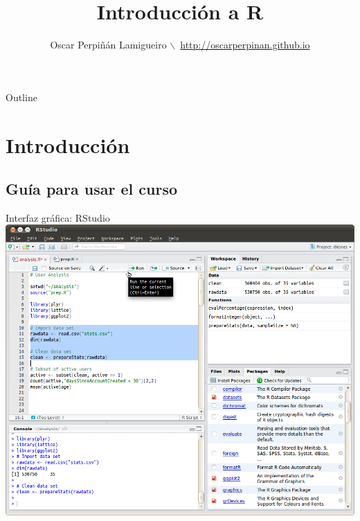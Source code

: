 \documentclass[xcolor={usenames,svgnames,dvipsnames}]{beamer}
\author{Oscar Perpiñán Lamigueiro $\backslash$\ \url{http://oscarperpinan.github.io}}
\date{}
\title{Introducción a R}
\begin{document}
\maketitle
\begin{frame}{Outline}
\tableofcontents
\end{frame}


\section{Introducción}
\label{sec:orgheadline18}


\subsection{Guía para usar el curso}
\label{sec:orgheadline7}

\begin{frame}[plain,label={sec:orgheadline1}]{Interfaz gráfica: RStudio}
\includegraphics[width=1.05\textwidth]{figs/rstudio-ubuntu.png}
\end{frame}
\end{document}
